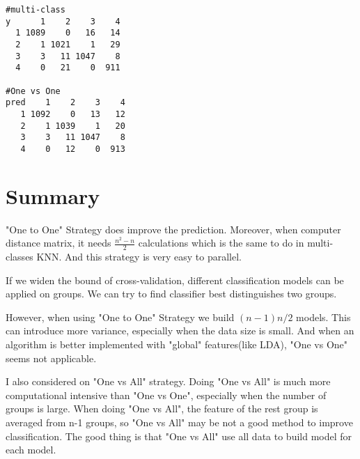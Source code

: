 \documentclass[12pt,a4paper]{article}
\begin{document}
\begin{verbatim}
#multi-class
y      1    2    3    4
  1 1089    0   16   14
  2    1 1021    1   29
  3    3   11 1047    8
  4    0   21    0  911
  
#One vs One
pred    1    2    3    4
   1 1092    0   13   12
   2    1 1039    1   20
   3    3   11 1047    8
   4    0   12    0  913
\end{verbatim}
\section{Summary}
"One to One" Strategy does improve the prediction. Moreover, when computer distance matrix, it needs $\frac{n^2-n}{2}$ calculations which is the same to do in multi-classes KNN. And this strategy is very easy to parallel.

If we widen the bound of cross-validation, different classification models can be applied on groups. We can try to find classifier best distinguishes two groups. 

However, when using "One to One" Strategy we build $(n-1)n/2$ models. This can introduce more variance, especially when the data size is small. And when an algorithm is better implemented with "global" features(like LDA), "One vs One"  seems not applicable.

I also considered on "One vs All" strategy. Doing "One vs All" is much more computational intensive than "One vs One", especially when the number of groups is large. When doing "One vs All", the feature of the rest group is averaged from n-1 groups, so "One vs All" may be not a good method to improve classification. The good thing is that "One vs All" use all data to build model for each model.
\end{document}
